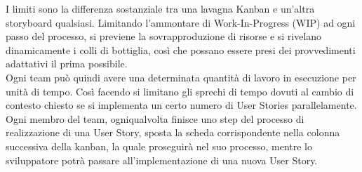 I limiti sono la differenza sostanziale tra una lavagna Kanban e un’altra storyboard qualsiasi. Limitando l’ammontare di Work-In-Progress (WIP) ad ogni passo del processo, si previene la sovrapproduzione di risorse e si rivelano dinamicamente i colli di bottiglia, così che possano essere presi dei provvedimenti adattativi il prima possibile.\\
Ogni team può quindi avere una determinata quantità di lavoro in esecuzione per unità di tempo. Così facendo si limitano gli sprechi di tempo dovuti al cambio di contesto chiesto se si implementa un certo numero di User Stories parallelamente. Ogni membro del team, ogniqualvolta finisce uno step del processo di realizzazione di una User Story, sposta la scheda corrispondente nella colonna successiva della kanban, la quale proseguirà nel suo processo, mentre lo sviluppatore potrà passare all’implementazione di una nuova User Story.

